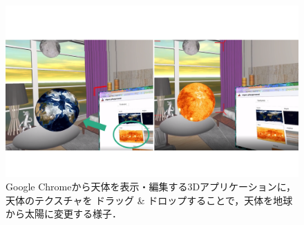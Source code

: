 \begin{figure}[htbp]
  \begin{minipage}[t]{0.50\linewidth}
    \centering
    \includegraphics[keepaspectratio, width=\linewidth]{fig/dnd.png}
    \caption{
      Google Chromeから天体を表示・編集する3Dアプリケーションに，天体のテクスチャを
      ドラッグ \& ドロップすることで，天体を地球から太陽に変更する様子．
    }
    \label{fig:dnd}
  \end{minipage}
\end{figure}
